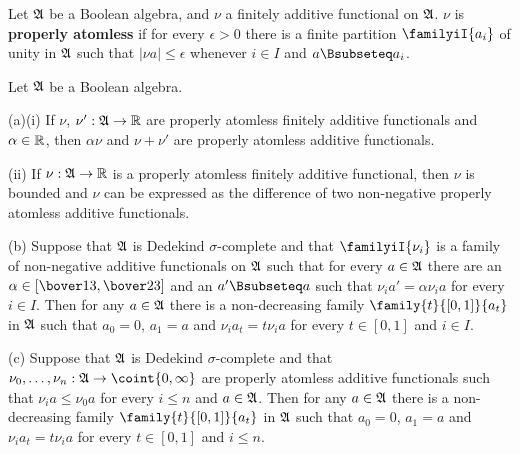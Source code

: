 Let $\frak A$ be a Boolean algebra, and $\nu$ a
finitely additive functional on $\frak A$.
 $\nu$ is
{\bf properly atomless} if for every $\epsilon>0$ there is a finite
partition
$\familyiI{a_i}$ of unity in $\frak A$ such that $|\nu a|\le\epsilon$
whenever $i\in I$ and $a\Bsubseteq a_i$.

 Let $\frak A$ be a Boolean algebra.

(a)(i) If $\nu$, $\nu':\frak A\to\Bbb R$ are properly atomless
finitely additive functionals and $\alpha\in\Bbb R$, then $\alpha\nu$
and $\nu+\nu'$ are properly atomless additive functionals.

\quad(ii) If $\nu:\frak A\to\Bbb R$ is a properly atomless
finitely additive
functional, then $\nu$ is bounded and $\nu$ can be expressed as the
difference of two non-negative properly atomless additive
functionals.

(b) Suppose that $\frak A$ is Dedekind $\sigma$-complete and that
$\familyiI{\nu_i}$ is a family of non-negative additive functionals on
$\frak A$ such that for every $a\in\frak A$ there are an
$\alpha\in[\bover13,\bover23]$ and an $a'\Bsubseteq a$ such that
$\nu_ia'=\alpha\nu_ia$ for every $i\in I$.
Then for any $a\in\frak A$ there is a
non-decreasing family $\family{t}{[0,1]}{a_t}$ in $\frak A$ such that
$a_0=0$, $a_1=a$ and $\nu_ia_t=t\nu_ia$ for every $t\in[0,1]$ and $i\in I$.

(c) Suppose that $\frak A$ is Dedekind $\sigma$-complete and that
$\nu_0,\ldots,\nu_n:\frak A\to\coint{0,\infty}$ are
properly atomless additive functionals such that $\nu_ia\le\nu_0a$ for
every $i\le n$ and $a\in\frak A$.   Then for any $a\in\frak A$ there is a
non-decreasing family $\family{t}{[0,1]}{a_t}$ in $\frak A$ such that
$a_0=0$, $a_1=a$ and $\nu_ia_t=t\nu_ia$ for every $t\in[0,1]$ and $i\le n$.

